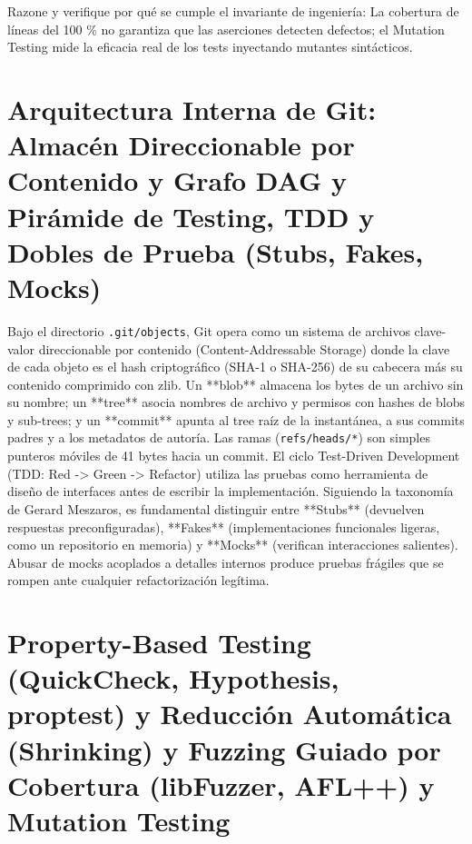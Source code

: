 \documentclass{book}
\begin{document}
\begin{tcolorbox}[title={Autoficha}, studiumcheck, breakable]

Razone y verifique por qué se cumple el invariante de ingeniería: La cobertura de líneas del 100 \% no garantiza que las aserciones detecten defectos; el Mutation Testing mide la eficacia real de los tests inyectando mutantes sintácticos.
\end{tcolorbox}

\section{Arquitectura Interna de Git: Almacén Direccionable por Contenido y Grafo DAG y Pirámide de Testing, TDD y Dobles de Prueba (Stubs, Fakes, Mocks)}

Bajo el directorio \texttt{.git/objects}, Git opera como un sistema de archivos clave-valor direccionable por contenido (Content-Addressable Storage) donde la clave de cada objeto es el hash criptográfico (SHA-1 o SHA-256) de su cabecera más su contenido comprimido con zlib. Un **blob** almacena los bytes de un archivo sin su nombre; un **tree** asocia nombres de archivo y permisos con hashes de blobs y sub-trees; y un **commit** apunta al tree raíz de la instantánea, a sus commits padres y a los metadatos de autoría. Las ramas (\texttt{refs/heads/*}) son simples punteros móviles de 41 bytes hacia un commit.
El ciclo Test-Driven Development (TDD: Red -> Green -> Refactor) utiliza las pruebas como herramienta de diseño de interfaces antes de escribir la implementación. Siguiendo la taxonomía de Gerard Meszaros, es fundamental distinguir entre **Stubs** (devuelven respuestas preconfiguradas), **Fakes** (implementaciones funcionales ligeras, como un repositorio en memoria) y **Mocks** (verifican interacciones salientes). Abusar de mocks acoplados a detalles internos produce pruebas frágiles que se rompen ante cualquier refactorización legítima.

\section{Property-Based Testing (QuickCheck, Hypothesis, proptest) y Reducción Automática (Shrinking) y Fuzzing Guiado por Cobertura (libFuzzer, AFL++) y Mutation Testing}
\end{document}
